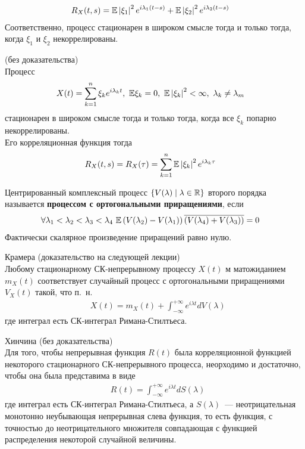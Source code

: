 \begin{align*}
  & R_X(t,s) = \mathbb{E} \left| \xi_1 \right|^2 e^{i \lambda_1 (t-s)} + \mathbb{E} \left| \xi_2 \right|^2 e^{i \lambda_2 (t-s)}
\end{align*}
Соответственно, процесс стационарен в широком смысле тогда и только тогда, когда
$\xi_1$ и $\xi_2$ некоррелированы.
\begin{theorem} (без доказательства)
    \\
    Процесс
    \begin{align*}
      & X(t) = \sum_{k=1}^n\xi_k e^{i\lambda_k t}, \ \mathbb{E} \xi_k = 0, \ \mathbb{E} \left| \xi_k \right|^2 < \infty, \ \lambda_k \neq \lambda_m
    \end{align*}
    стационарен в широком смысле тогда и только тогда, когда все $\xi_k$ попарно
    некоррелированы.
    \\
    Его корреляционная функция тогда
    \begin{align*}
      & R_X(t,s) = R_X(\tau) = \sum_{k=1}^n \mathbb{E} \left| \xi_k \right|^2 e^{i \lambda_k \tau}
    \end{align*}
\end{theorem}
\begin{Def}
    Центрированный комплексный процесс $\{V(\lambda) \mid \lambda \in \mathbb{R}\}$
    второго порядка называется \textbf{процессом с ортогональными
      приращениями}, если
    \begin{align*}
      & \forall \lambda_1 < \lambda_2 < \lambda_3 < \lambda_4 \ \mathbb{E} \left( V(\lambda_2) - V(\lambda_1) \right)\overline{\left( V(\lambda_4) + V(\lambda_3) \right)} = 0
    \end{align*}
    Фактически скалярное произведение приращений равно нулю.
\end{Def}
\begin{theorem} Крамера (доказательство на следующей лекции)
    \\
    Любому стационарному СК-непрерывному процессу $X(t)$ м матожиданием $m_X(t)$
    соответствует случайный процесс с ортогональными приращениями $V_X(t)$
    такой, что п.~н.
    \begin{align*}
      & X(t) = m_X(t) + \int_{-\infty}^{+\infty}e^{i\lambda t} dV(\lambda)
    \end{align*}
    где интеграл есть СК-интеграл Римана-Стилтьеса.
\end{theorem}
\begin{theorem} Хинчина (без доказательства)
    \\
    Для того, чтобы непрерывная функция $R(t)$ была корреляционной функцией
    некоторого стационарного СК-непрерывного процесса, неорходимо и достаточно,
    чтобы она была представима в виде
    \begin{align*}
      & R(t) = \int_{-\infty}^{+\infty}e^{i\lambda t} dS(\lambda)
    \end{align*}
    где интеграл есть СК-интеграл Римана-Стилтьеса, а $S(\lambda)$~---
    неотрицательная монотонно неубывающая непрерывная слева функция, то есть
    функция, с точностью до неотрицательного множителя совпадающая с функцией
    распределения некоторой случайной величины.
\end{theorem}

